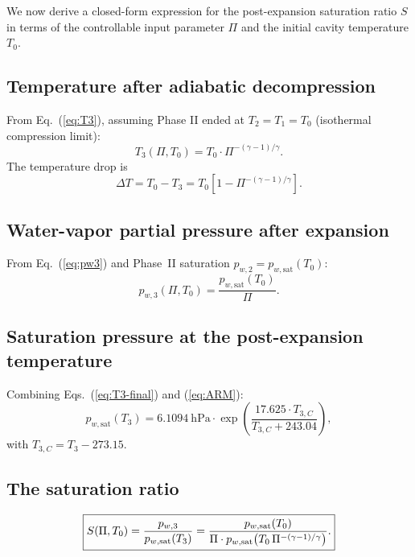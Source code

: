 \documentclass[11pt,a4paper]{article}
\newcommand{\pwsat}{p_{w,\text{sat}}}
\theoremstyle{definition}
\theoremstyle{plain}
\begin{document}
We now derive a closed-form expression for the post-expansion saturation ratio $S$ in terms of the controllable input parameter $\Pi$ and the initial cavity temperature $T_0$.

\subsection{Temperature after adiabatic decompression}

From Eq.~(\ref{eq:T3}), assuming Phase II ended at $T_2 = T_1 = T_0$ (isothermal compression limit):
\begin{equation}
\label{eq:T3-final}
T_3(\Pi, T_0) = T_0 \cdot \Pi^{-(\gamma-1)/\gamma}.
\end{equation}
The temperature drop is
\begin{equation}
\Delta T = T_0 - T_3 = T_0\left[1 - \Pi^{-(\gamma-1)/\gamma}\right].
\end{equation}

\subsection{Water-vapor partial pressure after expansion}

From Eq.~(\ref{eq:pw3}) and Phase~II saturation $p_{w,2} = \pwsat(T_0)$:
\begin{equation}
\label{eq:pw3-final}
p_{w,3}(\Pi, T_0) = \frac{\pwsat(T_0)}{\Pi}.
\end{equation}

\subsection{Saturation pressure at the post-expansion temperature}

Combining Eqs.~(\ref{eq:T3-final}) and (\ref{eq:ARM}):
\begin{equation}
\label{eq:psat3}
\pwsat(T_3) = \SI{6.1094}{\hecto\pascal} \cdot \exp\!\left(\frac{17.625 \cdot T_{3,C}}{T_{3,C} + 243.04}\right),
\end{equation}
with $T_{3,C} = T_3 - 273.15$.

\subsection{The saturation ratio}

\begin{equation}
\boxed{
\label{eq:S-final}
S(\Pi, T_0) = \frac{p_{w,3}}{\pwsat(T_3)} = \frac{\pwsat(T_0)}{\Pi \cdot \pwsat\!\left(T_0\,\Pi^{-(\gamma-1)/\gamma}\right)}.
}
\end{equation}
\end{document}
